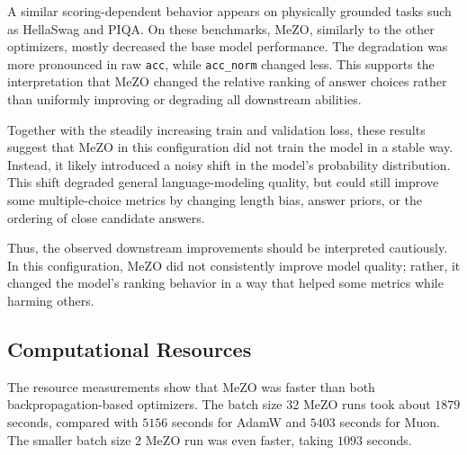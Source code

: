\documentclass{article}
\begin{document}
A similar scoring-dependent behavior appears on physically grounded tasks such as HellaSwag and PIQA. On these benchmarks, MeZO, similarly to the other optimizers, mostly decreased the base model performance. The degradation was more pronounced in raw \texttt{acc}, while \texttt{acc\_norm} changed less. This supports the interpretation that MeZO changed the relative ranking of answer choices rather than uniformly improving or degrading all downstream abilities.

Together with the steadily increasing train and validation loss, these results suggest that MeZO in this configuration did not train the model in a stable way. Instead, it likely introduced a noisy shift in the model's probability distribution. This shift degraded general language-modeling quality, but could still improve some multiple-choice metrics by changing length bias, answer priors, or the ordering of close candidate answers.

Thus, the observed downstream improvements should be interpreted cautiously. In this configuration, MeZO did not consistently improve model quality; rather, it changed the model's ranking behavior in a way that helped some metrics while harming others.

\subsection{Computational Resources}

\begin{table}[ht]
\centering
{}
\caption{Training time, maximum memory usage, and final quality.}
\label{tab:resource-efficiency}
\end{table}

The resource measurements show that MeZO was faster than both backpropagation-based optimizers. The batch size $32$ MeZO runs took about $1879$ seconds, compared with $5156$ seconds for AdamW and $5403$ seconds for Muon. The smaller batch size $2$ MeZO run was even faster, taking $1093$ seconds.
\end{document}
